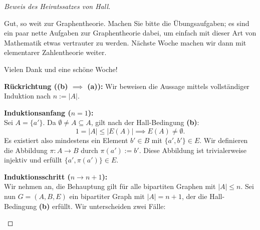 \begin{proof}[Beweis des Heiratssatzes von Hall]
\begin{spoken-clean}[01:27:20 - 01:28:40]
Gut, so weit zur Graphentheorie. Machen Sie bitte die Übungsaufgaben; es sind ein paar nette Aufgaben zur Graphentheorie dabei, um einfach mit dieser Art von Mathematik etwas vertrauter zu werden. Nächste Woche machen wir dann mit elementarer Zahlentheorie weiter.

Vielen Dank und eine schöne Woche!
\end{spoken-clean}

\begin{math-stroke}
\textbf{Rückrichtung (\texorpdfstring{\textbf{(b)} $\implies$ \textbf{(a)}}{b -> a}):}
Wir beweisen die Aussage mittels vollständiger Induktion nach $n := |A|$.
        
\textbf{Induktionsanfang ($n = 1$):} \\
Sei $A = \{a'\}$. Da $\emptyset \neq A \subseteq A$, gilt nach der Hall-Bedingung \textbf{(b)}:
\[
1 = |A| \le |E(A)| \implies E(A) \neq \emptyset.
\]
Es existiert also mindestens ein Element $b' \in B$ mit $\{a', b'\} \in E$. Wir definieren die Abbildung $\pi \colon A \to B$ durch $\pi(a') := b'$. Diese Abbildung ist trivialerweise injektiv und erfüllt $\{a', \pi(a')\} \in E$.
        
\textbf{Induktionsschritt ($n \to n+1$):} \\
Wir nehmen an, die Behauptung gilt für alle bipartiten Graphen mit $|A| \le n$. Sei nun $G = (A, B, E)$ ein bipartiter Graph mit $|A| = n+1$, der die Hall-Bedingung \textbf{(b)} erfüllt. Wir unterscheiden zwei Fälle:
        

\end{math-stroke}
\end{proof}
